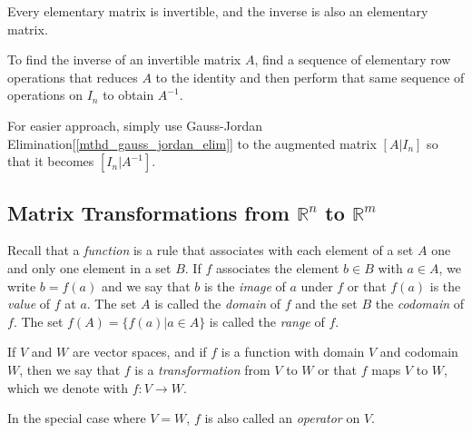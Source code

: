 \documentclass{report}
\begin{document}
		\begin{thm}
			Every elementary matrix is invertible, and the inverse is also an elementary matrix.
		\end{thm}
		
		\begin{mthd}
			To find the inverse of an invertible matrix $A$, find a sequence of elementary row operations that reduces $A$ to the identity and then perform that same sequence of operations on $I_n$ to obtain $A^{-1}$.
			
			For easier approach, simply use Gauss-Jordan Elimination[\ref{mthd_gauss_jordan_elim}] to the augmented matrix $\left[A|I_n\right]$ so that it becomes $\left[I_n|A^{-1}\right]$.
		\end{mthd}
		
	\subsection{Matrix Transformations from $\mathbb{R}^n$ to $\mathbb{R}^m$}
	
		Recall that a \emph{function} is a rule that associates with each element of a set $A$ one and only one element in a set $B$. If $f$ associates the element $b \in B$ with $a \in A$, we write $b=f(a)$ and we say that $b$ is the \emph{image} of $a$ under $f$ or that $f(a)$ is the \emph{value} of $f$ at $a$. The set $A$ is called the \emph{domain} of $f$ and the set $B$ the \emph{codomain} of $f$. The set $f(A)=\{f(a)|a \in A\}$ is called the \emph{range} of $f$.
		
		\begin{defn}[Transformation]
			If $V$ and $W$ are vector spaces, and if $f$ is a function with domain $V$ and codomain $W$, then we say that $f$ is a \emph{transformation} from $V$ to $W$ or that $f$ maps $V$ to $W$, which we denote with $f:V \rightarrow W$.
			
			In the special case where $V=W$, $f$ is also called an \emph{operator} on $V$.
		\end{defn}
		
\end{document}
